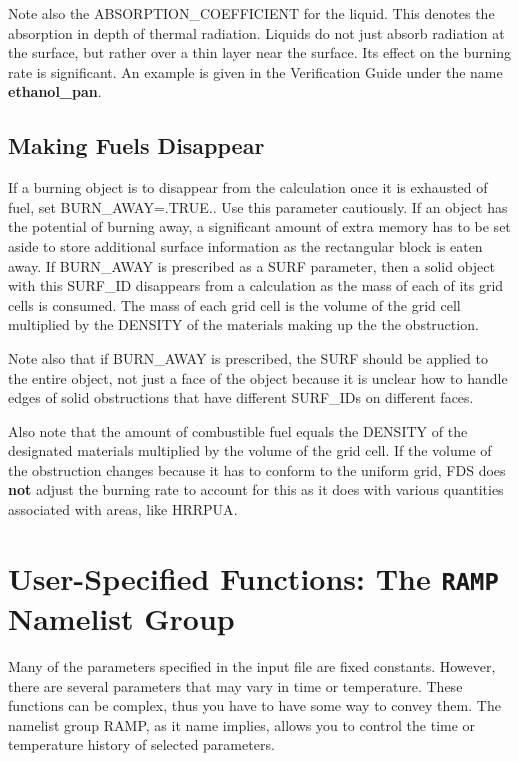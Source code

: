 \documentclass[11pt]{book}
\begin{document}
Note also the {\ct ABSORPTION\_COEFFICIENT} for the liquid. This
denotes the absorption in depth of thermal radiation. Liquids do not
just absorb radiation at the surface, but rather over a thin layer
near the surface. Its effect on the burning rate is significant. An
example is given in the Verification Guide under the name {\bf
ethanol\_pan}.


\subsection{Making Fuels Disappear}


If a burning object is to disappear from the
calculation once it is exhausted of fuel, set {\ct BURN\_AWAY=.TRUE.}.
Use this parameter cautiously. If an object has the potential of
burning away, a significant amount of extra memory has to be set aside
to store additional surface information as the rectangular block is
eaten away. If {\ct BURN\_AWAY} is prescribed as a {\ct SURF} parameter, then a solid
object with this {\ct SURF\_ID} disappears from a calculation as
the mass of each of its grid cells is consumed. The mass of each grid
cell is the volume of the grid cell multiplied by the {\ct DENSITY} of the
materials making up the the obstruction.

\begin{warning}
\noindent
Note also that if {\ct BURN\_AWAY} is prescribed, the {\ct SURF} should be applied to the
entire object, not just a face of the object because it is unclear how to handle edges
of solid obstructions that have different {\ct SURF\_ID}s on different faces.
\end{warning}

\noindent
Also note that the amount of combustible fuel equals the {\ct DENSITY} of the designated materials
multiplied by the volume of the grid cell. If the volume of the obstruction changes because it has
to conform to the uniform grid, FDS does {\bf not} adjust the burning rate to account for this as
it does with various quantities associated with areas, like {\ct HRRPUA}.



\clearpage

\section{User-Specified Functions: The \texorpdfstring{{\tt RAMP}}{RAMP} Namelist Group}
\label{info:RAMP}

Many of the parameters specified in the input file are fixed constants. However, there are several parameters that may vary in
time or temperature. These functions can be complex, thus you have to have some way to convey them. The namelist group
{\ct RAMP}, as it name implies, allows you to control the time or temperature history of selected parameters.
\end{document}
